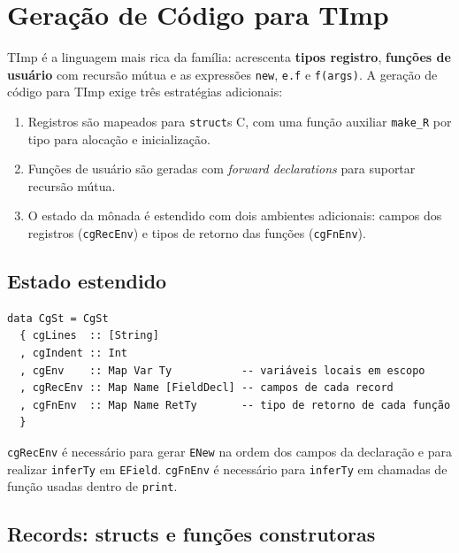 \section{Geração de Código para TImp}\label{sec:codegen-timp}

TImp é a linguagem mais rica da família: acrescenta \textbf{tipos registro},
\textbf{funções de usuário} com recursão mútua e as expressões \texttt{new},
\texttt{e.f} e \texttt{f(args)}.  A geração de código para TImp exige três
estratégias adicionais:

\begin{enumerate}
  \item Registros são mapeados para \texttt{struct}s C, com uma função
    auxiliar \texttt{make\_R} por tipo para alocação e inicialização.
  \item Funções de usuário são geradas com \emph{forward declarations}
    para suportar recursão mútua.
  \item O estado da mônada é estendido com dois ambientes adicionais:
    campos dos registros (\texttt{cgRecEnv}) e tipos de retorno das funções
    (\texttt{cgFnEnv}).
\end{enumerate}

\subsection{Estado estendido}

\begin{verbatim}
data CgSt = CgSt
  { cgLines  :: [String]
  , cgIndent :: Int
  , cgEnv    :: Map Var Ty           -- variáveis locais em escopo
  , cgRecEnv :: Map Name [FieldDecl] -- campos de cada record
  , cgFnEnv  :: Map Name RetTy       -- tipo de retorno de cada função
  }
\end{verbatim}

\texttt{cgRecEnv} é necessário para gerar \texttt{ENew} na ordem dos campos
da declaração e para realizar \texttt{inferTy} em \texttt{EField}.
\texttt{cgFnEnv} é necessário para \texttt{inferTy} em chamadas de função
usadas dentro de \texttt{print}.

\subsection{Records: structs e funções construtoras}

